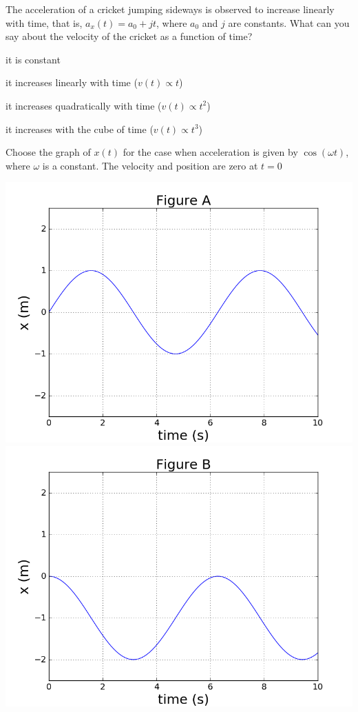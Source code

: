 \begin{checkpointMC}{The acceleration of a cricket jumping sideways is observed to increase linearly with time, that is, $a_x(t)=a_0+jt$, where $a_0$ and $j$ are constants. What can you say about the velocity of the cricket as a function of time?}
\item it is constant
\item it increases linearly with time ($v(t)\propto t$)
\item it increases quadratically with time ($v(t)\propto t^2$) %
\item it increases with the cube of time ($v(t)\propto t^3$)
\end{checkpointMC}

\begin{checkpointSA}{Choose the graph of $x(t)$ for the case when acceleration is given by $\cos(\omega t)$, where $\omega$ is a constant. The velocity and position are zero at $t=0$}
\begin{center}
\includegraphics[scale=0.25]{figures/DescribingMotionin1D/XfromAcheckpointFigA.png}
\includegraphics[scale=0.25]{figures/DescribingMotionin1D/XfromAcheckpointFigB.png}

\end{center}
\end{checkpointSA}
